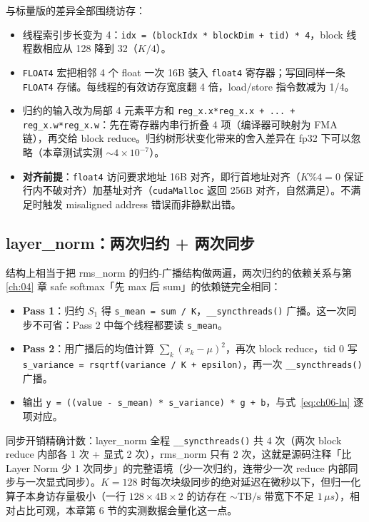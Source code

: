 与标量版的差异全部围绕访存：
\begin{itemize}
  \item 线程索引步长变为 4：\texttt{idx = (blockIdx * blockDim + tid) * 4}，block 线程数相应从 128 降到 32（$K/4$）。
  \item \texttt{FLOAT4} 宏把相邻 4 个 float 一次 16B 装入 \texttt{float4} 寄存器；写回同样一条 \texttt{FLOAT4} 存储。每线程的有效访存宽度翻 4 倍，load/store 指令数减为 1/4。
  \item 归约的输入改为局部 4 元素平方和 \texttt{reg\_\allowbreak{}x.\allowbreak{}x*reg\_\allowbreak{}x.\allowbreak{}x + .\allowbreak{}.\allowbreak{}.\allowbreak{} + reg\_\allowbreak{}x.\allowbreak{}w*reg\_\allowbreak{}x.\allowbreak{}w}：先在寄存器内串行折叠 4 项（编译器可映射为 FMA 链），再交给 block reduce。归约树形状变化带来的舍入差异在 fp32 下可以忽略（本章测试实测 $\sim 4 \times 10^{-7}$）。
  \item \textbf{对齐前提}：\texttt{float4} 访问要求地址 16B 对齐，即行首地址对齐（$K \% 4 = 0$ 保证行内不破对齐）加基址对齐（\texttt{cudaMalloc} 返回 256B 对齐，自然满足）。不满足时触发 misaligned address 错误而非静默出错。
\end{itemize}

\subsection{layer\_norm：两次归约 + 两次同步}



结构上相当于把 rms\_norm 的归约-广播结构做两遍，两次归约的依赖关系与第 \ref{ch:04} 章 safe softmax「先 max 后 sum」的依赖链完全相同：
\begin{itemize}
  \item \textbf{Pass 1}：归约 $S_1$ 得 \texttt{s\_mean = sum / K}，\texttt{\_\allowbreak{}\_\allowbreak{}syncthreads\allowbreak{}()} 广播。这一次同步不可省：Pass 2 中每个线程都要读 \texttt{s\_mean}。
  \item \textbf{Pass 2}：用广播后的均值计算 $\sum_k (x_k - \mu)^2$，再次 block reduce，tid 0 写 \texttt{s\_\allowbreak{}variance =\allowbreak{} rsqrtf\allowbreak{}(variance /\allowbreak{} K + epsilon)}，再一次 \texttt{\_\allowbreak{}\_\allowbreak{}syncthreads\allowbreak{}()} 广播。
  \item 输出 \texttt{y = ((value - s\_mean) * s\_variance) * g + b}，与式~\eqref{eq:ch06-ln} 逐项对应。
\end{itemize}
同步开销精确计数：layer\_norm 全程 \texttt{\_\allowbreak{}\_\allowbreak{}syncthreads\allowbreak{}()} 共 4 次（两次 block reduce 内部各 1 次 + 显式 2 次），rms\_norm 只有 2 次，这就是源码注释「比 Layer Norm 少 1 次同步」的完整语境（少一次归约，连带少一次 reduce 内部同步与一次显式同步）。$K = 128$ 时每次块级同步的绝对延迟在微秒以下，但归一化算子本身访存量极小（一行 $128 \times 4\mathrm{B} \times 2$ 的访存在 $\sim\mathrm{TB/s}$ 带宽下不足 $1\,\mu s$），相对占比可观，本章第 6 节的实测数据会量化这一点。

